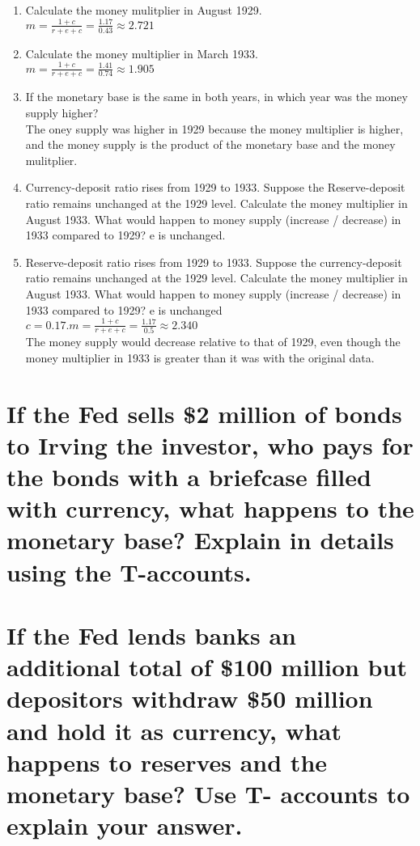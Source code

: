 \documentclass[12pt]{article}
\begin{document}
\begin{enumerate}
	\item Calculate the money mulitplier in August 1929.\\
	$m = \frac{1+c}{r+e+c} = \frac{1.17}{0.43} \approx 2.721$
	\item Calculate the money multiplier in March 1933. \\
	$m = \frac{1+c}{r+e+c} = \frac{1.41}{0.74} \approx 1.905$
	\item If the monetary base is the same in both years, in which
	year was the money supply higher?\\
	The oney supply was higher in 1929 because the money multiplier is higher, 
	and the money supply is the product of the monetary base and the money 
	mulitplier.
	\item Currency-deposit ratio rises from 1929 to 1933. Suppose the 
	Reserve-deposit ratio remains unchanged at the 1929 level. Calculate the 
	money multiplier in August 1933. What would happen to money supply 
	(increase / decrease) in 1933 compared to 1929? e is unchanged.

	\item Reserve-deposit ratio rises from 1929 to 1933. Suppose the 
	currency-deposit ratio remains unchanged at the 1929 level. Calculate the 
	money multiplier in August 1933. What would happen to money supply (increase
	/ decrease) in 1933 compared to 1929? e is unchanged\\
	$c = 0.17. m = \frac{1+c}{r+e+c} = \frac{1.17}{0.5} \approx 2.340$\\
	The money supply would decrease relative to that of 1929, even though the 
	money multiplier in 1933 is greater than it was with the original data.

\end{enumerate}

\section{If the Fed sells \$2 million of bonds to Irving the investor, who pays 
for the bonds with a briefcase filled with currency, what happens to the 
monetary base? Explain in details using the T-accounts.}

\section{If the Fed lends banks an additional total of \$100 million but 
depositors withdraw \$50 million and hold it as currency, what happens to 
reserves and the monetary base? Use T- accounts to explain your answer.}
\end{document}
